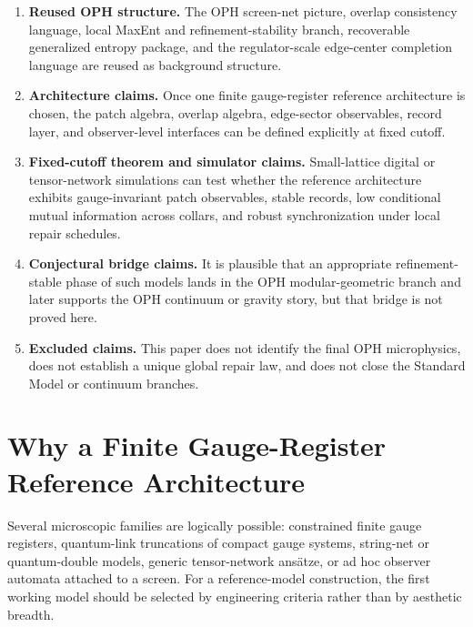 \documentclass[11pt]{article}
\begin{document}
\begin{enumerate}[leftmargin=2em,label=\textbf{(\roman*)}]
\item \textbf{Reused OPH structure.} The OPH screen-net picture, overlap consistency language,
local MaxEnt and refinement-stability branch, recoverable generalized entropy package, and the
regulator-scale edge-center completion language are reused as background structure.

\item \textbf{Architecture claims.} Once one finite gauge-register reference architecture is
chosen, the patch algebra, overlap algebra, edge-sector observables, record layer, and
observer-level interfaces can be defined explicitly at fixed cutoff.

\item \textbf{Fixed-cutoff theorem and simulator claims.} Small-lattice digital or tensor-network simulations can test
whether the reference architecture exhibits gauge-invariant patch observables, stable records,
low conditional mutual information across collars, and robust synchronization under local repair
schedules.

\item \textbf{Conjectural bridge claims.} It is plausible that an appropriate refinement-stable
phase of such models lands in the OPH modular-geometric branch and later supports the OPH
continuum or gravity story, but that bridge is not proved here.

\item \textbf{Excluded claims.} This paper does not identify the final OPH microphysics, does not
establish a unique global repair law, and does not close the Standard Model or continuum branches.
\end{enumerate}

\section{Why a Finite Gauge-Register Reference Architecture}

Several microscopic families are logically possible: constrained finite gauge registers,
quantum-link truncations of compact gauge systems, string-net or quantum-double models,
generic tensor-network ans\"atze, or ad hoc observer automata attached to a screen. For a
reference-model construction, the first working model should be selected by engineering
criteria rather than by aesthetic breadth.
\end{document}
